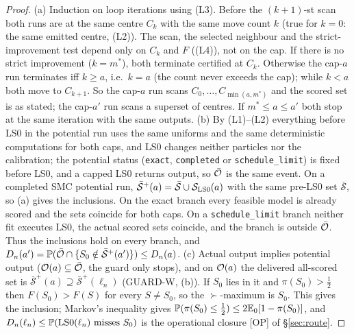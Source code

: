 \begin{proof}
(a) Induction on loop iterations using (L3). Before the $(k+1)$-st scan both runs are at the same centre $C_k$ with the same move count $k$ (true for $k=0$: the same emitted centre, (L2)). The scan, the selected neighbour and the strict-improvement test depend only on $C_k$ and $F$ ((L4)), not on the cap. If there is no strict improvement ($k=m^*$), both terminate certified at $C_k$. Otherwise the cap-$a$ run terminates iff $k\ge a$, i.e.\ $k=a$ (the count never exceeds the cap); while $k<a$ both move to $C_{k+1}$. So the cap-$a$ run scans $C_0,\dots,C_{\min(a,m^*)}$ and the scored set is as stated; the cap-$a'$ run scans a superset of centres. If $m^*\le a\le a'$ both stop at the same iteration with the same outputs.
(b) By (L1)--(L2) everything before LS0 in the potential run uses the same uniforms and the same deterministic computations for both caps, and LS0 changes neither particles nor the calibration; the potential status (\texttt{exact}, \texttt{completed} or \texttt{schedule\_limit}) is fixed before LS0, and a capped LS0 returns output, so $\bar{\mathcal O}$ is the same event. On a completed SMC potential run, $\bar{\mathcal S}^{+}(a)=\bar{\mathcal S}\cup\mathcal S_{\rm LS0}(a)$ with the same pre-LS0 set $\bar{\mathcal S}$, so (a) gives the inclusions. On the exact branch every feasible model is already scored and the sets coincide for both caps. On a \texttt{schedule\_limit} branch neither fit executes LS0, the actual scored sets coincide, and the branch is outside $\bar{\mathcal O}$. Thus the inclusions hold on every branch, and $D_n(a')=\mathbb P(\bar{\mathcal O}\cap\{S_0\notin\bar{\mathcal S}^{+}(a')\})\le D_n(a)$.
(c) Actual output implies potential output ($\mathcal O(a)\subseteq\bar{\mathcal O}$, the guard only stops), and on $\mathcal O(a)$ the delivered all-scored set is $\bar{\mathcal S}^{+}(a)\supseteq\bar{\mathcal S}^{+}(\ell_n)$ (GUARD-W, (b)). If $S_0$ lies in it and $\pi(S_0)>\frac12$ then $F(S_0)>F(S)$ for every $S\ne S_0$, so the $\succ$-maximum is $S_0$. This gives the inclusion; Markov's inequality gives $\mathbb P(\pi(S_0)\le\frac12)\le2\mathbb E_0[1-\pi(S_0)]$, and $D_n(\ell_n)\le\mathbb P(\text{LS0}(\ell_n)\text{ misses }S_0)$ is the operational closure [OP] of §\ref{sec:route}.
\end{proof}

